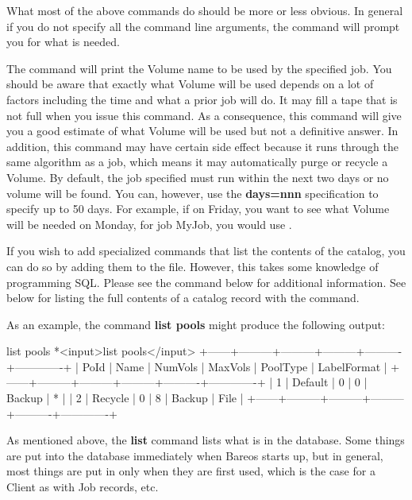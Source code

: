 \begin{description}
   What most of the above commands do should be more or less obvious.  In
   general if you do not specify all the command line arguments, the
   command will prompt you for what is needed.

   The  command will print the Volume name to be used by
   the specified job.  You should be aware that exactly what Volume will be
   used depends on a lot of factors including the time and what a prior job
   will do.  It may fill a tape that is not full when you issue this
   command.  As a consequence, this command will give you a good estimate
   of what Volume will be used but not a definitive answer.  In addition,
   this command may have certain side effect because it runs through the
   same algorithm as a job, which means it may automatically purge or
   recycle a Volume. By default, the job specified must run within the
   next two days or no volume will be found. You can, however, use the
   {\bf days=nnn} specification to specify up to 50 days. For example,
   if on Friday, you want to see what Volume will be needed on Monday,
   for job MyJob, you would use .

   If you wish to add specialized commands that list the contents of the
   catalog, you can do so by adding them to the  file.
   However, this takes some knowledge of programming SQL. Please see the
    command below for additional information.  See below for
   listing the full contents of a catalog record with the 
   command.

   As an example, the command {\bf list pools} might produce  the following
   output:

\begin{bconsole}{list pools}
*<input>list pools</input>
+------+---------+---------+---------+----------+-------------+
| PoId | Name    | NumVols | MaxVols | PoolType | LabelFormat |
+------+---------+---------+---------+----------+-------------+
|    1 | Default |       0 |       0 | Backup   | *           |
|    2 | Recycle |       0 |       8 | Backup   | File        |
+------+---------+---------+---------+----------+-------------+
\end{bconsole}

   As mentioned above, the {\bf list} command lists what is in the
   database.  Some things are put into the database immediately when Bareos
   starts up, but in general, most things are put in only when they are
   first used, which is the case for a Client as with Job records, etc.


\end{description}
